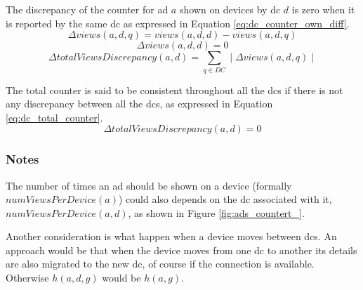 The discrepancy of the counter for ad $a$ shown on devices by \gls{dc} $d$ is zero when it is reported by the same \gls{dc} as expressed in Equation \ref{eq:dc_counter_own_diff}.
\begin{equation} \label{eq:dc_counter_diff}
	\Delta views(a, d, q) = views(a, d, d) - views(a, d, q)
\end{equation}
\begin{equation} \label{eq:dc_counter_own_diff}
	\Delta views(a, d, d) = 0
\end{equation}
\begin{equation} \label{eq:dc_total_counter_diff}
	\Delta totalViewsDiscrepancy(a, d) = \sum_{q \in DC} \mid \Delta views(a, d, q) \mid
\end{equation}

The total counter is said to be consistent throughout all the \glspl{dc} if there is not any discrepancy between all the \glspl{dc}, as expressed in Equation \ref{eq:dc_total_counter}.
\begin{equation} \label{eq:dc_total_counter_coherent}
	\Delta totalViewsDiscrepancy(a, d) = 0
\end{equation}


\subsubsection{Notes}
The number of times an ad should be shown on a device (formally $numViewsPerDevice(a)$) could also depends on the \gls{dc} associated with it, $numViewsPerDevice(a, d)$, as shown in Figure \ref{fig:ads_countert_}.

Another consideration is what happen when a device moves between \glspl{dc}. An approach would be that when the device moves from one \gls{dc} to another its details are also migrated to the new \gls{dc}, of course if the connection is available. Otherwise $h(a, d, g)$ would be $h(a, g)$.

